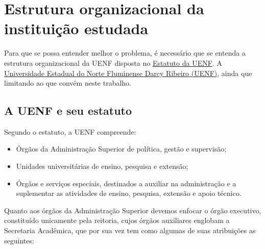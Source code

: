 \chapter[Estrutura organizacional da UENF]{Estrutura organizacional da instituição estudada} %

Para que se possa entender melhor o problema, é necessário que se entenda a estrutura organizacional da UENF disposta no \href{https://www.uenf.br/UENF_ARQUIVOS/Downloads/REITORIA_1360_1101117875.pdf}{Estatuto da UENF}. A \href{https://uenf.br/portal/}{Universidade Estadual do Norte Fluminense Darcy Ribeiro (UENF)}, ainda que limitando ao que convém neste trabalho.

\section{A UENF e seu estatuto} %


    Segundo o estatuto, a UENF compreende:

    \begin{itemize}
        \item Órgãos da Administração Superior de política, gestão e supervisão;
        \item Unidades universitárias de ensino, pesquisa e extensão;
        \item Órgãos e serviços especiais, destinados a auxiliar na administração e a suplementar as atividades de ensino, pesquisa, extensão e apoio técnico.
    \end{itemize}


    Quanto aos órgãos da Administração Superior devemos enfocar o órgão executivo, constituído unicamente pela reitoria, cujos órgãos auxiliares englobam a Secretaria Acadêmica, que por sua vez tem como algumas de suas atribuições as seguintes:

